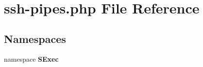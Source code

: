 \section{ssh-pipes.php File Reference}
\label{ssh-pipes_8php}
\subsection*{Namespaces}
\begin{CompactItemize}
\item 
namespace {\bf SExec}
\end{CompactItemize}
